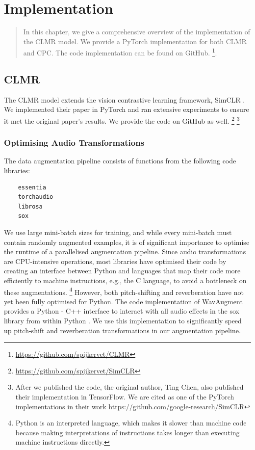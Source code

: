 \chapter{Implementation}
\begin{quote}
    In this chapter, we give a comprehensive overview of the implementation of the CLMR model. We provide a PyTorch \cite{pytorch2019} implementation for both CLMR and CPC. The code implementation can be found on GitHub. \footnote{\url{https://github.com/spijkervet/CLMR}}. 
\end{quote}


\section{CLMR}
The CLMR model extends the vision contrastive learning framework, SimCLR \cite{chen_simple_2020}. We implemented their paper in PyTorch and ran extensive experiments to ensure it met the original paper's results.
We provide the code on GitHub as well.
\footnote{\url{https://github.com/spijkervet/SimCLR}}
\footnote{After we published the code, the original author, Ting Chen, also published their implementation in TensorFlow. We are cited as one of the PyTorch implementations in their work \url{https://github.com/google-research/SimCLR}}

\subsection{Optimising Audio Transformations}
The data augmentation pipeline consists of functions from the following code libraries:
\begin{verbatim}
    essentia
    torchaudio
    librosa
    sox
\end{verbatim}
We use large mini-batch sizes for training, and while every mini-batch must contain randomly augmented examples, it is of significant importance to optimise the runtime of a parallelised augmentation pipeline.
Since audio transformations are CPU-intensive operations, most libraries have optimised their code by creating an interface between Python and languages that map their code more efficiently to machine instructions, e.g., the C language, to avoid a bottleneck on these augmentations.
\footnote{Python is an interpreted language, which makes it slower than machine code because making interpretations of instructions takes longer than executing machine instructions directly.}
However, both pitch-shifting and reverberation have not yet been fully optimised for Python. The code implementation of WavAugment provides a Python - C++ interface to interact with all audio effects in the sox library from within Python \cite{wavaugment2020}.
We use this implementation to significantly speed up pitch-shift and reverberation transformations in our augmentation pipeline.

